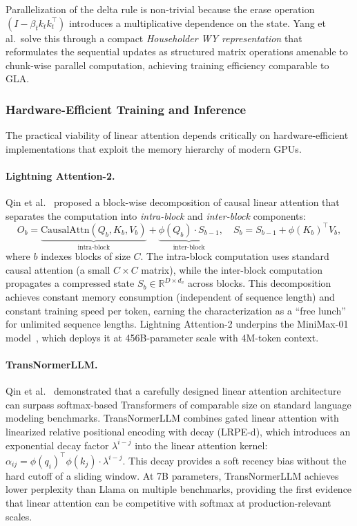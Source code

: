 Parallelization of the delta rule is non-trivial because the erase operation $(I - \beta_t k_t k_t^\top)$ introduces a multiplicative dependence on the state. Yang et al.\ solve this through a compact \emph{Householder WY representation} that reformulates the sequential updates as structured matrix operations amenable to chunk-wise parallel computation, achieving training efficiency comparable to GLA.

\subsubsection{Hardware-Efficient Training and Inference}
\label{subsubsec:hw-linear}

The practical viability of linear attention depends critically on hardware-efficient implementations that exploit the memory hierarchy of modern GPUs.

\paragraph{Lightning Attention-2.}
Qin et al.~\cite{qin2024lightning} proposed a block-wise decomposition of causal linear attention that separates the computation into \emph{intra-block} and \emph{inter-block} components:
\begin{equation}
O_b = \underbrace{\text{CausalAttn}(Q_b, K_b, V_b)}_{\text{intra-block}} + \underbrace{\phi(Q_b) \cdot S_{b-1}}_{\text{inter-block}}, \quad S_b = S_{b-1} + \phi(K_b)^\top V_b,
\label{eq:lightning}
\end{equation}
where $b$ indexes blocks of size $C$. The intra-block computation uses standard causal attention (a small $C \times C$ matrix), while the inter-block computation propagates a compressed state $S_b \in \mathbb{R}^{D \times d_v}$ across blocks. This decomposition achieves constant memory consumption (independent of sequence length) and constant training speed per token, earning the characterization as a ``free lunch'' for unlimited sequence lengths. Lightning Attention-2 underpins the MiniMax-01 model~\cite{minimax2025}, which deploys it at 456B-parameter scale with 4M-token context.

\paragraph{TransNormerLLM.}
Qin et al.~\cite{qin2024transnormerllm} demonstrated that a carefully designed linear attention architecture can surpass softmax-based Transformers of comparable size on standard language modeling benchmarks. TransNormerLLM combines gated linear attention with linearized relative positional encoding with decay (LRPE-d), which introduces an exponential decay factor $\lambda^{i-j}$ into the linear attention kernel: $\alpha_{ij} = \phi(q_i)^\top \phi(k_j) \cdot \lambda^{i-j}$. This decay provides a soft recency bias without the hard cutoff of a sliding window. At 7B parameters, TransNormerLLM achieves lower perplexity than Llama on multiple benchmarks, providing the first evidence that linear attention can be competitive with softmax at production-relevant scales.

